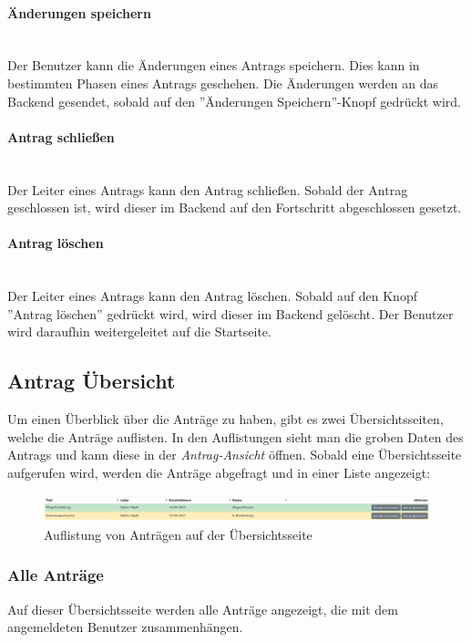 \paragraph{Änderungen speichern}~\\
Der Benutzer kann die Änderungen eines Antrags speichern. Dies kann in bestimmten Phasen eines Antrags geschehen. Die Änderungen werden an das Backend gesendet, sobald auf den ''Änderungen Speichern''-Knopf gedrückt wird.
\paragraph{Antrag schließen}~\\
Der Leiter eines Antrags kann den Antrag schließen. Sobald der Antrag geschlossen ist, wird dieser im Backend auf den Fortschritt abgeschlossen gesetzt.
\paragraph{Antrag löschen}~\\
Der Leiter eines Antrags kann den Antrag löschen. Sobald auf den Knopf ''Antrag löschen'' gedrückt wird, wird dieser im Backend gelöscht. Der Benutzer wird daraufhin weitergeleitet auf die Startseite.
\newpage
\subsection{Antrag Übersicht}
\label{sec:antrag_uebersicht}
Um einen Überblick über die Anträge zu haben, gibt es zwei Übersichtsseiten, welche die Anträge auflisten. In den Auflistungen sieht man die groben Daten des Antrags und kann diese in der \textit{Antrag-Ansicht} öffnen. Sobald eine Übersichtsseite aufgerufen wird, werden die Anträge abgefragt und in einer Liste angezeigt:
\begin{figure}[H]
	\centering
	\includegraphics[width=1\linewidth]{images/liste_antrag}
	\caption[Liste der Anträge]{Auflistung von Anträgen auf der Übersichtsseite}
	\label{fig:listeantrag}
\end{figure}

\subsubsection{Alle Anträge}
Auf dieser Übersichtsseite werden alle Anträge angezeigt, die mit dem angemeldeten Benutzer zusammenhängen.
